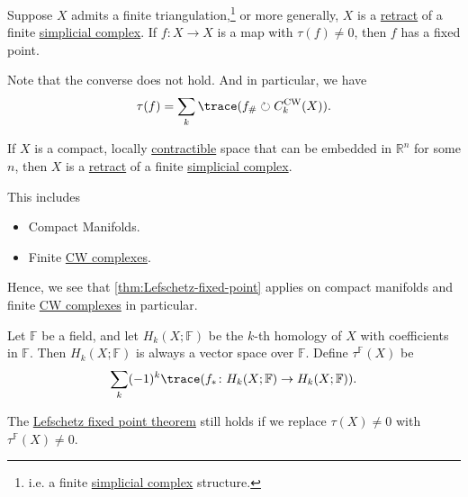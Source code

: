 \begin{theorem}\label{thm:Lefschetz-fixed-point}
	Suppose \(X\) admits a finite triangulation,\footnote{i.e. a finite \hyperref[def:simplicial-complex]{simplicial complex} structure.}
	or more generally, \(X\) is a \hyperref[def:retraction]{retract} of a finite \hyperref[def:simplicial-complex]{simplicial complex}.
	If \(f \colon X \to X\) is a map with \(\tau(f) \neq 0\), then \(f\) has a fixed point.
\end{theorem}
\begin{note}
	Note that the converse does not hold. And in particular, we have
	\[
		\tau (f) = \sum\limits_{k} \trace(f_\# \circlearrowright C^{\mathrm{CW}}_k(X) ).
	\]
\end{note}
\begin{theorem}\label{thm:retract-simplicial-complex}
	If \(X\) is a compact, locally \hyperref[def:contractible]{contractible} space that can be embedded in \(\mathbb{R}^n\) for some \(n\), then \(X\) is a
	\hyperref[def:retraction]{retract} of a finite \hyperref[def:simplicial-complex]{simplicial complex}.
\end{theorem}
\begin{remark}
	This includes
	\begin{itemize}
		\item Compact Manifolds.
		\item Finite \hyperref[def:CW-Complex]{CW complexes}.
	\end{itemize}
	Hence, we see that \autoref{thm:Lefschetz-fixed-point} applies on compact manifolds and finite \hyperref[def:CW-Complex]{CW complexes}
	in particular.
\end{remark}
\begin{definition}\label{def:Lefschetz-number-better}
	Let \(\mathbb{F}\) be a field, and let \(H_k(X; \mathbb{F})\) be the \(k\)-th homology of \(X\) with coefficients in \(\mathbb{F}\).
	Then \(H_k(X; \mathbb{F})\) is always a vector space over \(\mathbb{F}\). Define \(\tau^{\mathbb{F}}(X)\) be
	\[
		\sum_k (-1)^k \trace(f_\ast \colon H_k(X; \mathbb{F}) \to H_k(X; \mathbb{F})).
	\]
\end{definition}
\begin{remark}
	The \hyperref[thm:Lefschetz-fixed-point]{Lefschetz fixed point theorem} still holds if we replace \(\tau(X) \neq 0\) with \(\tau^{\mathbb{F}}(X) \neq 0\).
\end{remark}

